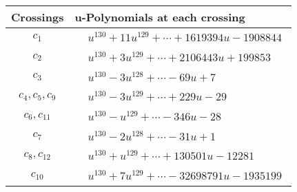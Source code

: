 \documentclass[1p]{elsarticle_modified}
\theoremstyle{definition}
\begin{document}
\begin{tabular}{m{50pt}|m{274pt}}
Crossings & \hspace{64pt}u-Polynomials at each crossing \\
\hline $$\begin{aligned}c_{1}\end{aligned}$$&$\begin{aligned}
&u^{130}+11 u^{129}+\cdots+1619394 u-1908844
\end{aligned}$\\
\hline $$\begin{aligned}c_{2}\end{aligned}$$&$\begin{aligned}
&u^{130}+3 u^{129}+\cdots+2106443 u+199853
\end{aligned}$\\
\hline $$\begin{aligned}c_{3}\end{aligned}$$&$\begin{aligned}
&u^{130}-3 u^{128}+\cdots-69 u+7
\end{aligned}$\\
\hline $$\begin{aligned}c_{4},c_{5},c_{9}\end{aligned}$$&$\begin{aligned}
&u^{130}-3 u^{129}+\cdots+229 u-29
\end{aligned}$\\
\hline $$\begin{aligned}c_{6},c_{11}\end{aligned}$$&$\begin{aligned}
&u^{130}- u^{129}+\cdots-346 u-28
\end{aligned}$\\
\hline $$\begin{aligned}c_{7}\end{aligned}$$&$\begin{aligned}
&u^{130}-2 u^{128}+\cdots-31 u+1
\end{aligned}$\\
\hline $$\begin{aligned}c_{8},c_{12}\end{aligned}$$&$\begin{aligned}
&u^{130}+u^{129}+\cdots+130501 u-12281
\end{aligned}$\\
\hline $$\begin{aligned}c_{10}\end{aligned}$$&$\begin{aligned}
&u^{130}+7 u^{129}+\cdots-32698791 u-1935199
\end{aligned}$\\
\hline
\end{tabular}\\~\\
\end{document}
